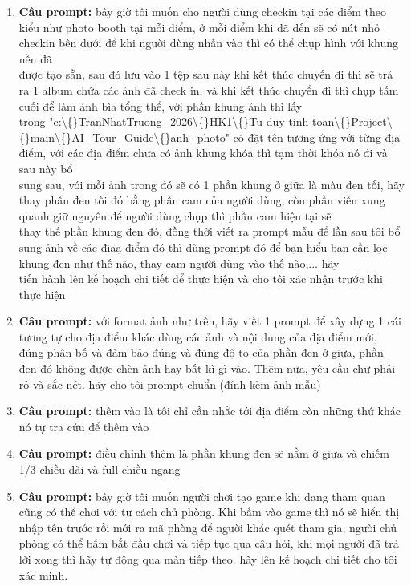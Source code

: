 \begin{enumerate}
\item \textbf{Câu prompt:} bây giờ tôi muốn cho người dùng checkin tại các điểm theo kiểu như photo booth tại mỗi điểm, ở mỗi điểm khi dã đến sẽ có nút nhỏ checkin bên dưới để khi người dùng nhấn vào thì có thể chụp hình với khung nền đã \\
  được tạo sẵn, sau đó lưu vào 1 tệp sau này khi kết thúc chuyến đi thì sẽ trả ra 1 album chứa các ảnh đã check in, và khi kết thúc chuyển đi thì chụp tấm cuối để làm ảnh bìa tổng thể, với phần khung ảnh thì lấy \\
  trong "c:\textbackslash\{\}TranNhatTruong\_2026\textbackslash\{\}HK1\textbackslash\{\}Tu duy tinh toan\textbackslash\{\}Project\textbackslash\{\}main\textbackslash\{\}AI\_Tour\_Guide\textbackslash\{\}anh\_photo" có đặt tên tương ứng với từng địa điểm, với các địa điểm chưa có ảnh khung  khóa thì tạm thời khóa nó đi và sau này bổ \\
  sung sau, với mỗi ảnh trong đó sẽ có 1 phần khung ở giữa là màu đen tối, hãy thay phần đen tối đó bằng phần cam của người dùng, còn phần viền xung quanh giữ nguyên để người dùng chụp thì phần cam hiện tại sẽ \\
  thay thế phần khung đen đó, đồng thời viết ra prompt mẫu để lần sau tôi bổ sung ảnh về các điaạ điểm đó thì dùng prompt đó để bạn hiểu bạn cần lọc khung đen như thế nào, thay cam người dùng vào thế nào,... hãy \\
  tiến hành lên kế hoạch chi tiết để thực hiện và cho tôi xác nhận trước khi thực hiện \\


\item \textbf{Câu prompt:} với format ảnh như trên, hãy viết 1 prompt để xây dựng 1 cái tương tự cho địa điểm khác dùng các ảnh và nội dung của địa điểm mới, đúng phân bố và đảm bảo đúng và đúng độ to của phần đen ở giữa, phần đen đó không được chèn ảnh hay bất kì gì vào. Thêm nữa, yêu cầu chữ phải rỏ và sắc nét. hãy cho tôi prompt chuẩn (đính kèm ảnh mẫu) \\


\item \textbf{Câu prompt:} thêm vào là tôi chỉ cần nhắc tới địa điểm còn những thứ khác nó tự tra cứu để thêm vào \\


\item \textbf{Câu prompt:} điều chỉnh thêm là phần khung đen sẽ nằm ở giữa và chiếm 1/3 chiều dài và full chiều ngang \\


\item \textbf{Câu prompt:} bây giờ tôi muốn người chơi tạo game khi đang tham quan cũng có thể chơi với tư cách chủ phòng. Khi bấm vào game thì nó sẽ hiển thị nhập tên trước rồi mới ra mã phòng để người khác quét tham gia, người chủ phòng có thể bấm bắt đầu chơi và tiếp tục qua câu hỏi, khi mọi người đã trả lời xong thì hãy tự động qua màn tiếp theo. hãy lên kế hoạch chi tiết cho tôi xác minh. \\

\end{enumerate}


